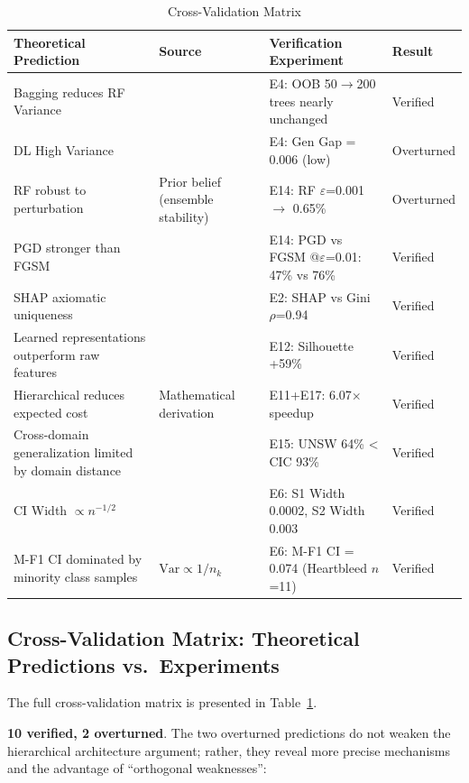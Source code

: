 \documentclass[sigconf]{acmart}
\begin{document}
\begin{table}[!t]
\caption{Cross-Validation Matrix}
\label{tab:cross_validation}
\begin{tabular}{p{5.0cm}p{2.2cm}p{5.4cm}p{2.2cm}}
\toprule
\textbf{Theoretical Prediction} & \textbf{Source} & \textbf{Verification Experiment} & \textbf{Result} \\
\midrule
Bagging reduces RF Variance & \cite{11} & E4: OOB 50$\to$200 trees nearly unchanged & Verified \\
DL High Variance & \cite{5} & E4: Gen Gap = 0.006 (low) & Overturned \\
RF robust to perturbation & Prior belief (ensemble stability) & E14: RF $\varepsilon$=0.001 $\to$ 0.65\% & Overturned \\
PGD stronger than FGSM & \cite{17} & E14: PGD vs FGSM @$\varepsilon$=0.01: 47\% vs 76\% & Verified \\
SHAP axiomatic uniqueness & \cite{16} & E2: SHAP vs Gini $\rho$=0.94 & Verified \\
Learned representations outperform raw features & \cite{5} & E12: Silhouette +59\% & Verified \\
Hierarchical reduces expected cost & Mathematical derivation & E11+E17: 6.07$\times$ speedup & Verified \\
Cross-domain generalization limited by domain distance & \cite{10} & E15: UNSW 64\% < CIC 93\% & Verified \\
CI Width $\propto n^{-1/2}$ & \cite{13} & E6: S1 Width 0.0002, S2 Width 0.003 & Verified \\
M-F1 CI dominated by minority class samples & $\text{Var} \propto 1/n_k$ & E6: M-F1 CI = 0.074 (Heartbleed $n$=11) & Verified \\
\bottomrule
\end{tabular}
\end{table}

\subsection{Cross-Validation Matrix: Theoretical Predictions vs.\ Experiments} The full cross-validation matrix is presented in Table~\ref{tab:cross_validation}.

\textbf{10 verified, 2 overturned}. The two overturned predictions do not weaken the hierarchical architecture argument; rather, they reveal more precise mechanisms and the advantage of ``orthogonal weaknesses'':
\end{document}

